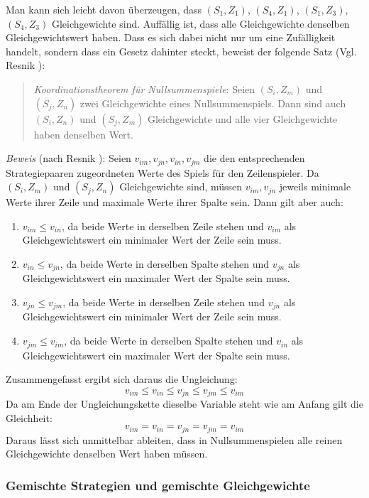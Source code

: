 Man kann sich leicht davon überzeugen, dass $(S_1,Z_1)$, $(S_4,Z_1)$,
$(S_1,Z_3), $$(S_4,Z_3)$ Gleichgewichte sind. 
Auffällig ist, dass alle Gleichgewichte
denselben Gleichgewichtswert haben. Dass es sich dabei nicht nur um eine
Zufälligkeit handelt, sondern dass ein Gesetz dahinter steckt, beweist der
folgende Satz (Vgl. Resnik \cite[S. 131]{resnik:1987}):

\begin{quote}
{\em Koordinationstheorem für Nullsummenspiele}: Seien $(S_i, Z_m)$ und $(S_j,
Z_n)$ zwei Gleichgewichte eines Nullsummenspiels. Dann sind auch $(S_i, Z_n)$
und $(S_j, Z_m)$ Gleichgewichte und alle vier Gleichgewichte haben denselben
Wert.
\end{quote}

{\em Beweis} (nach Resnik \cite[S. 131]{resnik:1987}): Seien $v_{im}, v_{jn},
v_{in}, v_{jm}$ die den entsprechenden Strategiepaaren zugeordneten Werte des
Spiels für den Zeilenspieler. Da $(S_i, Z_m)$ und $(S_j, Z_n)$ Gleichgewichte
sind, müssen $v_{im}, v_{jn}$ jeweils minimale Werte ihrer Zeile und maximale
Werte ihrer Spalte sein. Dann gilt aber auch:
\begin{enumerate}
  \item $v_{im} \leq v_{in}$, da beide Werte in derselben Zeile stehen und
  $v_{im}$ als Gleichgewichtswert ein minimaler Wert der Zeile sein muss.
  \item $v_{in} \leq v_{jn}$, da beide Werte in derselben Spalte stehen und
  $v_{jn}$ als Gleichgewichtswert ein maximaler Wert der Spalte sein muss.
  \item $v_{jn} \leq v_{jm}$, da beide Werte in derselben Zeile stehen und
  $v_{jn}$ als Gleichgewichtswert ein minimaler Wert der Zeile sein muss. 
  \item $v_{jm} \leq v_{im}$, da beide Werte in derselben Spalte stehen und
  $v_{in}$ als Gleichgewichtswert ein maximaler Wert der Spalte sein muss. 
\end{enumerate}

Zusammengefasst ergibt sich daraus die Ungleichung:
\[ v_{im} \leq v_{in} \leq v_{jn} \leq v_{jm} \leq v_{im} \]
Da am Ende der Ungleichungskette dieselbe Variable steht wie am Anfang gilt die
Gleichheit:
\[ v_{im} = v_{in} = v_{jn} = v_{jm} = v_{im} \]
Daraus lässt sich unmittelbar ableiten, dass in Nullsummenspielen alle reinen
Gleichgewichte denselben Wert haben müssen.

\subsubsection{Gemischte Strategien und gemischte Gleichgewichte}

